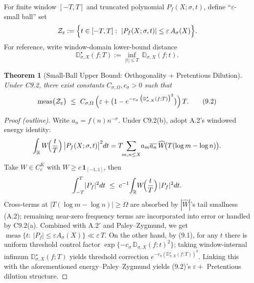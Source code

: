 \documentclass[11pt,a4paper]{article}
\newtheorem{theorem}{Theorem}[section]
\theoremstyle{remark}
\DeclareMathOperator{\meas}{meas}
\begin{document}
For finite window $[-T,T]$ and truncated polynomial $P_f(X;\sigma,t)$, define ``$\varepsilon$-small ball'' set
\begin{equation}
\mathcal{Z}_\varepsilon:=\Bigl\{t\in[-T,T]:\ |P_f(X;\sigma,t)|\le \varepsilon\,A_\sigma(X)\Bigr\}.
\end{equation}
For reference, write window-domain lower-bound distance
\begin{equation}
\mathbb{D}^{\star}_{\sigma,X}(f;T):=\inf_{|t|\le T}\ \mathbb{D}_{\sigma,X}(f;t).
\end{equation}

\begin{theorem}[Small-Ball Upper Bound: Orthogonality + Pretentious Dilution]\label{thm:small_ball}
Under C9.2, there exist constants $C_{\sigma,\Omega},c_\sigma>0$ such that
\begin{equation}
\meas\bigl(\mathcal{Z}_\varepsilon\bigr)\ \le\ C_{\sigma,\Omega}\,\Bigl(\varepsilon+\bigl(1-e^{-c_\sigma\,\bigl(\mathbb{D}^{\star}_{\sigma,X}(f;T)\bigr)^2}\bigr)\Bigr)\,T.
\tag{9.2}
\end{equation}
\end{theorem}

\begin{proof}[Proof (outline)]
Write $a_n=f(n)n^{-\sigma}$. Under C9.2(b), adopt A.2's windowed energy identity:
\begin{equation*}
\int_{\mathbb{R}} W\!\Bigl(\frac{t}{T}\Bigr)\,\bigl|P_f(X;\sigma,t)\bigr|^2 dt
=T\!\!\sum_{m,n\le X}\! a_m\overline{a_n}\,\widehat{W}\!\bigl(T(\log m-\log n)\bigr).
\end{equation*}
Take $W\in C_c^K$ with $W\ge c\,\mathbf{1}_{[-1,1]}$, then
\begin{equation*}
\int_{-T}^{T}\!|P_f|^2 dt\ \le\ c^{-1}\!\int_{\mathbb{R}}\! W\!\Bigl(\frac{t}{T}\Bigr)\,|P_f|^2 dt.
\end{equation*}
Cross-terms at $|T(\log m-\log n)|\ge\Omega$ are absorbed by $|\widehat{W}|$'s tail smallness (A.2); remaining near-zero frequency terms are incorporated into error or handled by C9.2(a). Combined with A.2$'$ and Paley--Zygmund, we get $\meas\{t:\ |P_f|\le \varepsilon A_\sigma(X)\}\ll \varepsilon\, T$. On the other hand, by (9.1), for any $t$ there is uniform threshold control factor $\exp\{-c_\sigma\,\mathbb{D}_{\sigma,X}(f;t)^2\}$; taking window-internal infimum $\mathbb{D}^{\star}_{\sigma,X}(f;T)$ yields threshold correction $e^{-c_\sigma(\mathbb{D}^{\star}_{\sigma,X}(f;T))^2}$. Linking this with the aforementioned energy--Paley--Zygmund yields (9.2)'s $\varepsilon+$ Pretentious dilution structure.
\end{proof}
\end{document}
